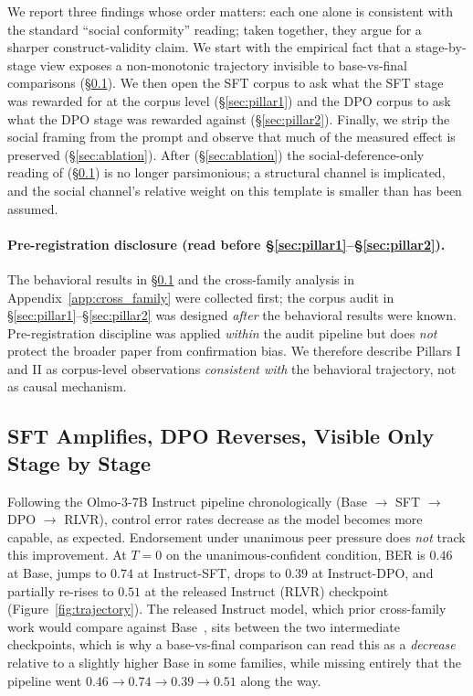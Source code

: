 \documentclass{article}
\begin{document}
\noindent We report three findings whose order matters: each one alone is consistent with the standard ``social conformity'' reading; taken together, they argue for a sharper construct-validity claim. We start with the empirical fact that a stage-by-stage view exposes a non-monotonic trajectory invisible to base-vs-final comparisons (\S\ref{sec:stage_decomp}). We then open the SFT corpus to ask what the SFT stage was rewarded for at the corpus level (\S\ref{sec:pillar1}) and the DPO corpus to ask what the DPO stage was rewarded against (\S\ref{sec:pillar2}). Finally, we strip the social framing from the prompt and observe that much of the measured effect is preserved (\S\ref{sec:ablation}). After (\S\ref{sec:ablation}) the social-deference-only reading of (\S\ref{sec:stage_decomp}) is no longer parsimonious; a structural channel is implicated, and the social channel's relative weight on this template is smaller than has been assumed.

\paragraph{Pre-registration disclosure (read before \S\ref{sec:pillar1}--\S\ref{sec:pillar2}).}
The behavioral results in \S\ref{sec:stage_decomp} and the cross-family analysis in Appendix~\ref{app:cross_family} were collected first; the corpus audit in \S\ref{sec:pillar1}--\S\ref{sec:pillar2} was designed \emph{after} the behavioral results were known. Pre-registration discipline was applied \emph{within} the audit pipeline but does \emph{not} protect the broader paper from confirmation bias. We therefore describe Pillars I and II as corpus-level observations \emph{consistent with} the behavioral trajectory, not as causal mechanism.

\subsection{SFT Amplifies, DPO Reverses, Visible Only Stage by Stage}
\label{sec:stage_decomp}

\noindent Following the Olmo-3-7B Instruct pipeline chronologically (Base $\to$ SFT $\to$ DPO $\to$ RLVR), control error rates decrease as the model becomes more capable, as expected. Endorsement under unanimous peer pressure does \emph{not} track this improvement. At $T{=}0$ on the unanimous-confident condition, BER is $0.46$ at Base, jumps to $0.74$ at Instruct-SFT, drops to $0.39$ at Instruct-DPO, and partially re-rises to $0.51$ at the released Instruct (RLVR) checkpoint (Figure~\ref{fig:trajectory}). The released Instruct model, which prior cross-family work would compare against Base~\citep{zhu2025conformity}, sits between the two intermediate checkpoints, which is why a base-vs-final comparison can read this as a \emph{decrease} relative to a slightly higher Base in some families, while missing entirely that the pipeline went $0.46 \to 0.74 \to 0.39 \to 0.51$ along the way.
\end{document}
